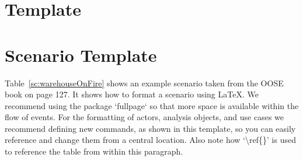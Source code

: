 \section{Template}
\maketitle

%
%
\newcommand{\fieldofficer}{\texttt{FieldOfficer}\xspace}
\newcommand{\dispatcher}{\texttt{Dispatcher}\xspace}
\newcommand{\incident}{\texttt{Incident}\xspace}
\newcommand{\reportemergency}{\texttt{ReportEmergency}\xspace}
\newcommand{\openincident}{\texttt{OpenIncident}\xspace}

\section{Scenario Template}
Table~\ref{sc:warehouseOnFire} shows an example scenario taken from the OOSE book on page 127. It shows how to format a scenario using \LaTeX. We recommend using the package `fullpage` so that more space is available within the flow of events. For the formatting of actors, analysis objects, and use cases we recommend defining new commands, as shown in this template, so you can easily reference and change them from a central location. Also note how `\textbackslash ref\{\}' is used to reference the table from within this paragraph.

